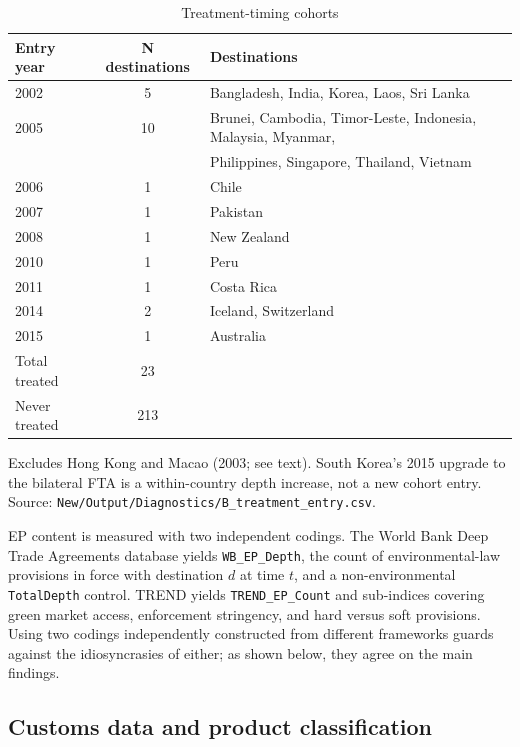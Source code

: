 \documentclass[12pt]{article}
\begin{document}
\begin{table}[htbp]
\centering
\caption{Treatment-timing cohorts}
\label{tab:cohorts}
\small
\begin{threeparttable}
\begin{tabular}{lcl}
\toprule
Entry year & N destinations & Destinations \\
\midrule
2002 & 5 & Bangladesh, India, Korea, Laos, Sri Lanka \\
2005 & 10 & Brunei, Cambodia, Timor-Leste, Indonesia, Malaysia, Myanmar, \\
     &    & Philippines, Singapore, Thailand, Vietnam \\
2006 & 1  & Chile \\
2007 & 1  & Pakistan \\
2008 & 1  & New Zealand \\
2010 & 1  & Peru \\
2011 & 1  & Costa Rica \\
2014 & 2  & Iceland, Switzerland \\
2015 & 1  & Australia \\
\midrule
Total treated & 23 & \\
Never treated & 213 & \\
\bottomrule
\end{tabular}
\begin{tablenotes}\footnotesize
\item Excludes Hong Kong and Macao (2003; see text). South Korea's 2015 upgrade to
the bilateral FTA is a within-country depth increase, not a new cohort entry.
Source: \texttt{New/Output/Diagnostics/B\_treatment\_entry.csv}.
\end{tablenotes}
\end{threeparttable}
\end{table}

EP content is measured with two independent codings. The World Bank Deep Trade
Agreements database \citep{hofmann2017} yields \texttt{WB\_EP\_Depth}, the count of
environmental-law provisions in force with destination $d$ at time $t$, and a
non-environmental \texttt{TotalDepth} control. TREND \citep{morin2018} yields
\texttt{TREND\_EP\_Count} and sub-indices covering green market access, enforcement
stringency, and hard versus soft provisions. Using two codings independently constructed
from different frameworks guards against the idiosyncrasies of either; as shown below,
they agree on the main findings.

\subsection{Customs data and product classification}
\end{document}
